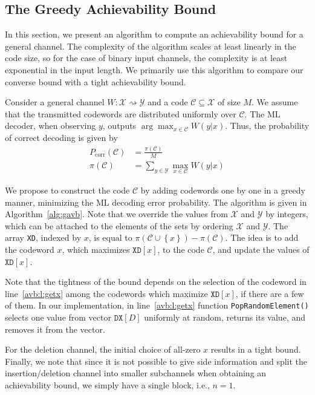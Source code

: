 \documentclass[journal, twocol]{IEEEtran}
\newcommand{\mC}{{\mathcal{C}}}
\newcommand{\mX}{{\mathcal{X}}}
\newcommand{\mY}{{\mathcal{Y}}}
\newcommand{\set}[1]{{\left\{{#1}\right\}}}
\newcommand{\tosq}{\rightsquigarrow}
\newcommand{\var}[1]{\texttt{#1}}
\begin{document}
\subsection{The Greedy Achievability Bound}
\label{s:gavb}

In this section, we present an algorithm to compute an achievability bound for a general channel.
The complexity of the algorithm scales at least linearly in the code size, so for the case of binary input channels, the complexity is at least exponential in the input length.
We primarily use this algorithm to compare our converse bound with a tight achievability bound.

Consider a general channel $W:\mX\tosq\mY$ and a code $\mC\subseteq \mX$ of size $M$.
We assume that the transmitted codewords are distributed uniformly over $\mC$.
The ML decoder, when observing $y$, outputs $\arg\max_{x\in\mC} W(y|x)$.
Thus, the probability of correct decoding is given by
\begin{align}
P_{\text{corr}}(\mC) &= \frac{\pi(\mC)}{M} 
\label{eq:Pc}
\\
\pi(\mC) &= \sum_{y\in\mY}\max_{x\in\mC} W(y|x)
\label{eq:pi}
\end{align}

\normalsize
We propose to construct the code $\mC$ by adding codewords one by one in a greedy manner, minimizing the ML decoding error probability.
The algorithm is given in Algorithm~\ref{alg:gavb}.
Note that we override the values from $\mX$ and $\mY$ by integers, which can be attached to the elements of the sets by ordering $\mX$ and $\mY$.
The array \var{XD}, indexed by $x$, is equal to $\pi(\mC\cup\set{x})-\pi(\mC)$.
The idea is to add the codeword $x$, which maximizes $\var{XD}[x]$, to the code $\mC$, and update the values of $\var{XD}[x]$.

Note that the tightness of the bound depends on the selection of the codeword in line~\ref{avb:l:getx} among the codewords which maximize $\var{XD}[x]$, if there are a few of them.
In our implementation, in line~\ref{avb:l:getx} function \var{PopRandomElement()} selects one value from vector $\var{DX}[D]$ uniformly at random, returns its value, and removes it from the vector.

For the deletion channel, the initial choice of all-zero $x$ results in a tight bound. Finally, we note that since it is not possible to give side information and split the insertion/deletion channel into smaller subchannels when obtaining an achievability bound, we simply have a single block, i.e., $n=1$.
\end{document}
